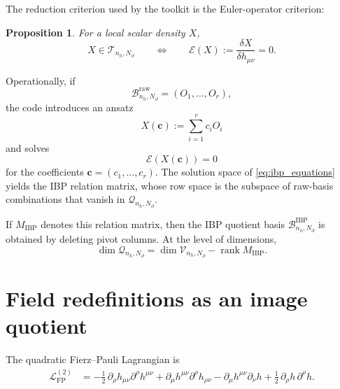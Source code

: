 \documentclass[11pt]{report}
\numberwithin{equation}{chapter}
\newtheorem{proposition}[definition]{Proposition}
\newcommand{\Vspace}[2]{\mathcal{V}_{#1,#2}}
\newcommand{\Tspace}[2]{\mathcal{T}_{#1,#2}}
\newcommand{\Qspace}[2]{\mathcal{Q}_{#1,#2}}
\newcommand{\Rank}{\operatorname{rank}}
\newcommand{\LagFP}{\mathcal{L}_{\mathrm{FP}}^{(2)}}
\newcommand{\Euler}{\mathcal{E}}
\newcommand{\Raw}{\mathrm{raw}}
\newcommand{\IBP}{\mathrm{IBP}}
\begin{document}
The reduction criterion used by the toolkit is the Euler-operator criterion:
\begin{proposition}
For a local scalar density \(X\),
\begin{equation}
  X \in \Tspace{n_h}{N_\partial}
  \qquad \Longleftrightarrow \qquad
  \Euler(X) := \frac{\delta X}{\delta h_{\mu\nu}} = 0.
  \label{eq:euler_criterion}
\end{equation}
\end{proposition}

Operationally, if
\begin{equation}
  \mathcal{B}^{\Raw}_{n_h,N_\partial}
  =
  \left(
    O_1,\dots,O_r
  \right),
\end{equation}
the code introduces an ansatz
\begin{equation}
  X(\bm{c})
  :=
  \sum_{i=1}^{r} c_i O_i
  \label{eq:ibp_ansatz}
\end{equation}
and solves
\begin{equation}
  \Euler(X(\bm{c})) = 0
  \label{eq:ibp_equations}
\end{equation}
for the coefficients \(\bm{c}=(c_1,\dots,c_r)\).
The solution space of \eqref{eq:ibp_equations} yields the IBP relation matrix, whose row space is the subspace of raw-basis combinations that vanish in \(\Qspace{n_h}{N_\partial}\).

If \(M_{\IBP}\) denotes this relation matrix, then the IBP quotient basis
\(
\mathcal{B}^{\IBP}_{n_h,N_\partial}
\)
is obtained by deleting pivot columns.
At the level of dimensions,
\begin{equation}
  \dim \Qspace{n_h}{N_\partial}
  =
  \dim \Vspace{n_h}{N_\partial}
  -
  \Rank M_{\IBP}.
  \label{eq:ibp_dimension_formula}
\end{equation}

\section{Field redefinitions as an image quotient}

The quadratic Fierz--Pauli Lagrangian is
\begin{equation}
\begin{aligned}
\LagFP
&=
-
\frac{1}{2}\,
\partial_\rho h_{\mu\nu}\partial^\rho h^{\mu\nu}
+
\partial_\mu h^{\mu\nu}\partial^\rho h_{\rho\nu}
-
\partial_\mu h^{\mu\nu}\partial_\nu h
+
\frac{1}{2}\,
\partial_\rho h\,\partial^\rho h .
\end{aligned}
\label{eq:fierz_pauli}
\end{equation}
\end{document}
